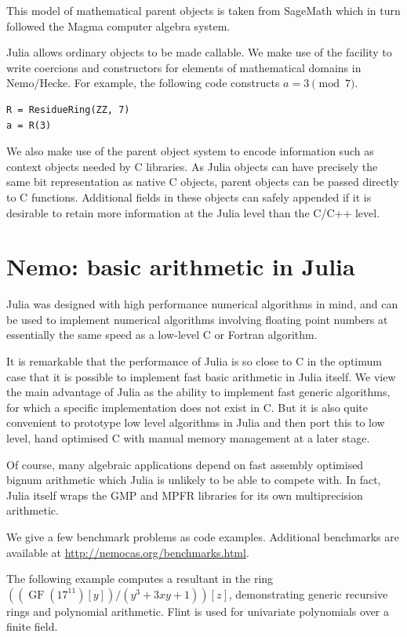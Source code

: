 \documentclass{sig-alternate-05-2015}
\begin{document}
This model of mathematical parent objects is taken from SageMath which in turn followed the Magma
computer algebra system.

Julia allows ordinary objects to be made callable. We make use of the facility to write coercions
and constructors for elements of mathematical domains in Nemo/Hecke. For example, the following
code constructs $a = 3 \pmod{7}$.

\begin{verbatim}
R = ResidueRing(ZZ, 7)
a = R(3)
\end{verbatim}

We also make use of the parent object system to encode information such as context objects needed
by C libraries. As Julia objects can have precisely the same bit representation as native C objects,
parent objects can be passed directly to C functions. Additional fields in these objects can safely
appended if it is desirable to retain more information at the Julia level than the C/C++ level. 

\section{Nemo: basic arithmetic in Julia}

Julia was designed with high performance numerical algorithms in mind, and can be used to
implement numerical algorithms involving floating point numbers at essentially the same
speed as a low-level C or Fortran algorithm. 

It is remarkable that the performance of Julia is so close to C in the optimum case that
it is possible to implement fast basic arithmetic in Julia itself. We view the main
advantage of Julia as the ability to implement fast generic algorithms, for which a specific
implementation does not exist in C. But it is also quite convenient to prototype low level
algorithms in Julia and then port this to low level, hand optimised C with manual memory
management at a later stage.

Of course, many algebraic applications depend on fast assembly optimised bignum arithmetic
which Julia is unlikely to be able to compete with. In fact, Julia itself wraps the GMP
\cite{gmp} and MPFR \cite{mpfr} libraries for its own multiprecision arithmetic.

We give a few benchmark problems as code examples.
Additional benchmarks are available
at \url{http://nemocas.org/benchmarks.html}.

The following example computes a resultant
in the ring $((\operatorname{GF}(17^{11})[y])/(y^3 + 3xy + 1))[z]$,
demonstrating generic recursive rings and polynomial
arithmetic. Flint is used for univariate polynomials over a finite field.
\end{document}
